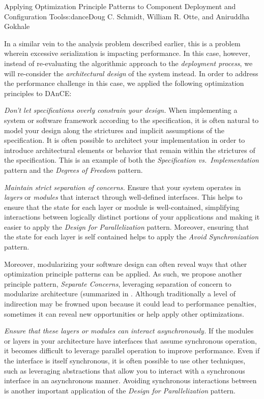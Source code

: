 \begin{aosachapter}{Applying Optimization Principle Patterns to Component Deployment and
                    Configuration Tools}{s:dance}{Doug C. Schmidt, William R. Otte, and Aniruddha Gokhale}

In a similar vein to the analysis problem described earlier, this is a
problem wherein excessive serialization is impacting performance. In
this case, however, instead of re-evaluating the algorithmic approach to
the \emph{deployment process}, we will re-consider the
\emph{architectural design} of the system instead. In order to address
the performance challenge in this case, we applied the following
optimization principles to DAnCE:

\begin{aosaenumerate}
\def\labelenumi{\arabic{enumi}.}
\item
  \emph{Don't let specifications overly constrain your design.} When
  implementing a system or software framework according to the
  specification, it is often natural to model your design along the
  strictures and implicit assumptions of the specification. It is often
  possible to architect your implementation in order to introduce
  architectural elements or behavior that remain within the strictures
  of the specification. This is an example of both the
  \emph{Specification vs.~Implementation} pattern and the \emph{Degrees
  of Freedom} pattern.
\item
  \emph{Maintain strict separation of concerns.} Ensure that your system
  operates in \emph{layers} or \emph{modules} that interact through
  well-defined interfaces. This helps to ensure that the state for each
  layer or module is well-contained, simplifying interactions between
  logically distinct portions of your applications and making it easier
  to apply the \emph{Design for Parallelization} pattern. Moreover,
  ensuring that the state for each layer is self contained helps to
  apply the \emph{Avoid Synchronization} pattern.

  Moreover, modularizing your software design can often reveal ways that
  other optimization principle patterns can be applied. As such, we
  propose another principle pattern, \emph{Separate Concerns},
  leveraging separation of concern to modularize architecture
  (summarized in . Although
  traditionally a level of indirection may be frowned upon because it
  could lead to performance penalties, sometimes it can reveal new
  opportunities or help apply other optimizations.
\item
  \emph{Ensure that these layers or modules can interact
  asynchronously.} If the modules or layers in your architecture have
  interfaces that assume synchronous operation, it becomes difficult to
  leverage parallel operation to improve performance. Even if the
  interface is itself synchronous, it is often possible to use other
  techniques, such as leveraging abstractions that allow you to interact
  with a synchronous interface in an asynchronous manner. Avoiding
  synchronous interactions between is another important application of
  the \emph{Design for Parallelization} pattern.
\end{aosaenumerate}


\end{aosachapter}
